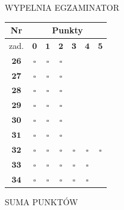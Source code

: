 \documentclass[10pt]{article}
\begin{document}
WYPELNIA EGZAMINATOR

\begin{center}
\begin{tabular}{|c|c|c|c|c|c|c|}
\hline
Nr & \multicolumn{6}{|c|}{Punkty} \\
\hline
zad. & \(\mathbf{0}\) & \(\mathbf{1}\) & \(\mathbf{2}\) & \(\mathbf{3}\) & \(\mathbf{4}\) & \(\mathbf{5}\) \\
\hline
\(\mathbf{2 6}\) & \(\square\) & \(\square\) & \(\square\) &  &  &  \\
\hline
\(\mathbf{2 7}\) & \(\square\) & \(\square\) & \(\square\) &  &  &  \\
\hline
\(\mathbf{2 8}\) & \(\square\) & \(\square\) & \(\square\) &  &  &  \\
\hline
\(\mathbf{2 9}\) & \(\square\) & \(\square\) & \(\square\) &  &  &  \\
\hline
\(\mathbf{3 0}\) & \(\square\) & \(\square\) & \(\square\) &  &  &  \\
\hline
\(\mathbf{3 1}\) & \(\square\) & \(\square\) & \(\square\) &  &  &  \\
\hline
\(\mathbf{3 2}\) & \(\square\) & \(\square\) & \(\square\) & \(\square\) & \(\square\) & \(\square\) \\
\hline
\(\mathbf{3 3}\) & \(\square\) & \(\square\) & \(\square\) & \(\square\) & \(\square\) &  \\
\hline
\(\mathbf{3 4}\) & \(\square\) & \(\square\) & \(\square\) & \(\square\) & \(\square\) &  \\
\hline
\end{tabular}
\end{center}

SUMA PUNKTÓW
\end{document}
